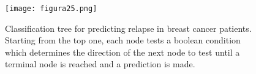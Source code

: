 \begin{figure}[hbtp]
\centering
\texttt{[image: figura25.png]}
\caption[Classification tree for predicting relapse in breast cancer patients]{Classification tree for predicting relapse in breast cancer patients. Starting from the top one, each node tests a boolean condition which determines the direction of the next node to test until a terminal node is reached and a prediction is made.}
\label{figura25}
\end{figure}
